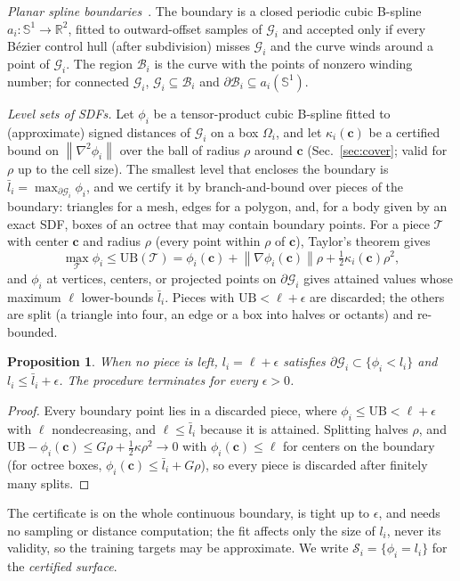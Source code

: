 \documentclass[journal]{IEEEtran}
\newtheorem{proposition}{Proposition}
\theoremstyle{definition}
\newcommand{\R}{\mathbb{R}}
\newcommand{\Sone}{\mathbb{S}^1}
\newcommand{\norm}[1]{\left\lVert #1\right\rVert}
\begin{document}
\emph{Planar spline boundaries}~\cite{jo2027semantic}. The boundary is a closed periodic cubic
B-spline $a_i:\Sone\to\R^2$, fitted to outward-offset samples of $\mathcal G_i$ and accepted only if
every B\'ezier control hull (after subdivision) misses $\mathcal G_i$ and the curve winds around a
point of $\mathcal G_i$. The region $\mathcal B_i$ is the curve with the points of nonzero winding
number; for connected $\mathcal G_i$, $\mathcal G_i\subseteq\mathcal B_i$ and
$\partial\mathcal B_i\subseteq a_i(\Sone)$.

\emph{Level sets of SDFs.} Let $\phi_i$ be a tensor-product cubic B-spline fitted to (approximate)
signed distances of $\mathcal G_i$ on a box $\Omega_i$, and let $\kappa_i(\mathbf c)$ be a certified
bound on $\norm{\nabla^2\phi_i}$ over the ball of radius $\rho$ around $\mathbf c$ (Sec.~\ref{sec:cover};
valid for $\rho$ up to the cell size). The smallest level that encloses the boundary is
$\bar l_i=\max_{\partial\mathcal G_i}\phi_i$, and we certify it by branch-and-bound over pieces of the
boundary: triangles for a mesh, edges for a polygon, and, for a body given by an exact SDF, boxes of an
octree that may contain boundary points. For a piece $\mathcal T$ with center $\mathbf c$ and radius
$\rho$ (every point within $\rho$ of $\mathbf c$), Taylor's theorem gives
\begin{equation}\label{eq:level-ub}
\max_{\mathcal T}\phi_i\le\mathrm{UB}(\mathcal T)=\phi_i(\mathbf c)+\norm{\nabla\phi_i(\mathbf c)}\rho
+\tfrac12\kappa_i(\mathbf c)\rho^2 ,
\end{equation}
and $\phi_i$ at vertices, centers, or projected points on $\partial\mathcal G_i$ gives attained values
whose maximum $\ell$ lower-bounds $\bar l_i$. Pieces with $\mathrm{UB}<\ell+\epsilon$ are discarded;
the others are split (a triangle into four, an edge or a box into halves or octants) and re-bounded.
\begin{proposition}\label{prop:level}
When no piece is left, $l_i=\ell+\epsilon$ satisfies $\partial\mathcal G_i\subset\{\phi_i<l_i\}$ and
$l_i\le\bar l_i+\epsilon$. The procedure terminates for every $\epsilon>0$.
\end{proposition}
\begin{proof}
Every boundary point lies in a discarded piece, where $\phi_i\le\mathrm{UB}<\ell+\epsilon$ with $\ell$
nondecreasing, and $\ell\le\bar l_i$ because it is attained. Splitting halves $\rho$, and
$\mathrm{UB}-\phi_i(\mathbf c)\le G\rho+\tfrac12\kappa\rho^2\to0$ with $\phi_i(\mathbf c)\le\ell$ for
centers on the boundary (for octree boxes, $\phi_i(\mathbf c)\le\bar l_i+G\rho$), so every piece is
discarded after finitely many splits.
\end{proof}
The certificate is on the whole continuous boundary, is tight up to $\epsilon$, and needs no
sampling or distance computation; the fit affects only the size of $l_i$, never its validity, so the
training targets may be approximate. We write $\mathcal S_i=\{\phi_i=l_i\}$ for the
\emph{certified surface}.
\end{document}
